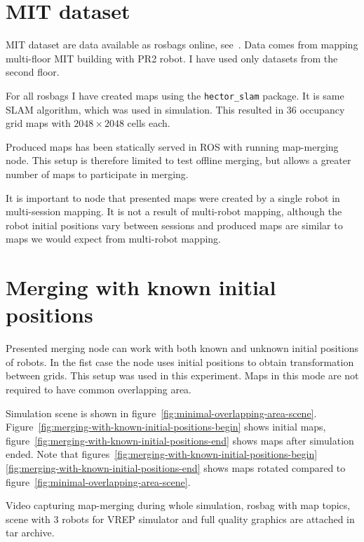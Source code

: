 \section{\gls{MIT} dataset}
\label{sec:mit-dataset}

\gls{MIT} dataset are data available as rosbags online, see~\cite{Fallon2013}. Data comes from mapping multi-floor \gls{MIT} building with PR2 robot. I have used only datasets from the second floor.

For all rosbags I have created maps using the \texttt{hector\_slam} package. It is same \gls{SLAM} algorithm, which was used in simulation. This resulted in $36$ occupancy grid maps with $2048 \times 2048$ cells each.

Produced maps has been statically served in \gls{ROS} with running map-merging node. This setup is therefore limited to test offline merging, but allows a greater number of maps to participate in merging.

It is important to node that presented maps were created by a single robot in multi-session mapping. It is not a result of multi-robot mapping, although the robot initial positions vary between sessions and produced maps are similar to maps we would expect from multi-robot mapping.

\section{Merging with known initial positions}
\label{sec:merging-with-known-initial-positions}

Presented merging node can work with both known and unknown initial positions of robots. In the fist case the node uses initial positions to obtain transformation between grids. This setup was used in this experiment. Maps in this mode are not required to have common overlapping area.

Simulation scene is shown in figure~\ref{fig:minimal-overlapping-area-scene}. Figure~\ref{fig:merging-with-known-initial-positions-begin} shows initial maps, figure~\ref{fig:merging-with-known-initial-positions-end} shows maps after simulation ended. Note that figures~\ref{fig:merging-with-known-initial-positions-begin} \ref{fig:merging-with-known-initial-positions-end} shows maps rotated compared to figure~\ref{fig:minimal-overlapping-area-scene}.

Video capturing map-merging during whole simulation, rosbag with map topics, scene with $3$ robots for \gls{VREP} simulator and full quality graphics are attached in tar archive.

